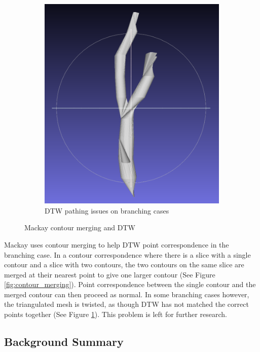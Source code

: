 \documentclass[11p, titlepage]{article}
\begin{document}
\begin{figure}[h]
\begin{subfigure}[b]{0.4\textwidth}
         \includegraphics[width=\textwidth]{reconstructions/dtw-multi-branch-10}
         \caption{DTW pathing issues on branching cases}
         \label{fig:dtw_issues}
     \end{subfigure}
        \caption{Mackay contour merging and DTW}
        \label{fig:dtw}
\end{figure}

Mackay \cite{mackay2019robust} uses contour merging to help DTW point correspondence in the branching case. In a contour correspondence where there is a slice with a single contour and a slice with two contours, the two contours on the same slice are merged at their nearest point to give one larger contour (See Figure \ref{fig:contour_merging}). Point correspondence between the single contour and the merged contour can then proceed as normal. In some branching cases however, the triangulated mesh is twisted, as though DTW has not matched the correct points together (See Figure \ref{fig:dtw_issues}). This problem is left for further research.

\subsection{Background Summary}
\end{document}
